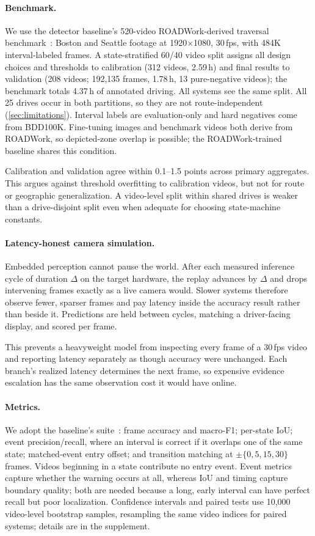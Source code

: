 \documentclass[journal]{IEEEtran}
\begin{document}
\paragraph{Benchmark.} We use the detector baseline's 520-video ROADWork-derived traversal benchmark~\cite{priorsystem2026}: Boston and Seattle footage at 1920$\times$1080, 30\,fps, with 484K interval-labeled frames.  A state-stratified 60/40 video split assigns all design choices and thresholds to calibration (312 videos, 2.59\,h) and final results to validation (208 videos; 192{,}135 frames, 1.78\,h, 13 pure-negative videos); the benchmark totals 4.37\,h of annotated driving.  All systems see the same split.  All 25 drives occur in both partitions, so they are not route-independent (\cref{sec:limitations}).  Interval labels are evaluation-only and hard negatives come from BDD100K.  Fine-tuning images and benchmark videos both derive from ROADWork, so depicted-zone overlap is possible; the ROADWork-trained baseline shares this condition.

Calibration and validation agree within 0.1--1.5 points across primary aggregates.  This argues against threshold overfitting to calibration videos, but not for route or geographic generalization.  A video-level split within shared drives is weaker than a drive-disjoint split even when adequate for choosing state-machine constants.

\paragraph{Latency-honest camera simulation.} Embedded perception cannot pause the world.  After each measured inference cycle of duration $\Delta$ on the target hardware, the replay advances by $\Delta$ and drops intervening frames exactly as a live camera would.  Slower systems therefore observe fewer, sparser frames and pay latency inside the accuracy result rather than beside it.  Predictions are held between cycles, matching a driver-facing display, and scored per frame.

This prevents a heavyweight model from inspecting every frame of a 30\,fps video and reporting latency separately as though accuracy were unchanged.  Each branch's realized latency determines the next frame, so expensive evidence escalation has the same observation cost it would have online.

\paragraph{Metrics.} We adopt the baseline's suite~\cite{priorsystem2026}: frame accuracy and macro-F1; per-state IoU; event precision/recall, where an interval is correct if it overlaps one of the same state; matched-event entry offset; and transition matching at $\pm\{0,5,15,30\}$ frames.  Videos beginning in a state contribute no entry event.  Event metrics capture whether the warning occurs at all, whereas IoU and timing capture boundary quality; both are needed because a long, early interval can have perfect recall but poor localization.  Confidence intervals and paired tests use 10{,}000 video-level bootstrap samples, resampling the same video indices for paired systems; details are in the supplement.
\end{document}
